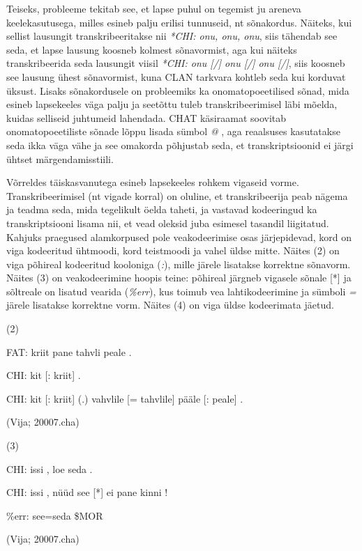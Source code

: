 \documentclass[12pt]{article}
\begin{document}
Teiseks, probleeme tekitab see, et lapse puhul on tegemist ju areneva keelekasutusega, milles esineb palju erilisi tunnuseid, nt sõnakordus. Näiteks, kui sellist lausungit transkribeeritakse nii \emph{*CHI: onu, onu, onu}, siis tähendab see seda, et lapse lausung koosneb kolmest sõnavormist, aga kui näiteks transkribeerida seda lausungit viisil \emph{*CHI: onu [/] onu [/] onu [/]}, siis koosneb see lausung ühest sõnavormist, kuna CLAN tarkvara kohtleb seda kui korduvat üksust. Lisaks sõnakordusele on probleemiks ka onomatopoeetilised sõnad, mida esineb lapsekeeles väga palju ja seetõttu tuleb transkribeerimisel läbi mõelda, kuidas selliseid juhtumeid lahendada. CHAT käsiraamat soovitab onomatopoeetiliste sõnade lõppu lisada sümbol \emph{@} \citep[72--73]{Argus2007}, aga reaalsuses kasutatakse seda ikka väga vähe ja see omakorda põhjustab seda, et transkriptsioonid ei järgi ühtset märgendamisstiili.

Võrreldes täiskasvanutega esineb lapsekeeles rohkem vigaseid vorme. Transkribeerimisel (nt vigade korral) on oluline, et transkribeerija peab nägema ja teadma seda, mida tegelikult öelda taheti, ja vastavad kodeeringud ka transkriptsiooni lisama nii, et vead oleksid juba esimesel tasandil liigitatud. \citep[74]{Argus2007} Kahjuks praegused alamkorpused pole veakodeerimise osas järjepidevad, kord on viga kodeeritud ühtmoodi, kord teistmoodi ja vahel üldse mitte. Näites (2) on viga põhireal kodeeritud kooloniga (\emph{:}), mille järele lisatakse korrektne sõnavorm. Näites (3) on veakodeerimine hoopis teine: põhireal järgneb vigasele sõnale [*] ja sõltreale on lisatud vearida (\emph{\%err}), kus  toimub vea lahtikodeerimine ja sümboli \emph{=} järele lisatakse korrektne vorm. Näites (4) on viga üldse kodeerimata jäetud.
\hfill

(2)
\begin{description}
    \item*FAT: kriit pane tahvli peale .
    \item*CHI: kit [: kriit] .
    \item*CHI: kit [: kriit] (.) vahvlile [= tahvlile] pääle [: peale] .
    \item(Vija; 20007.cha)
\end{description}
\hfill

(3)
\begin{description}
    \item*CHI: issi , loe seda .
    \item*CHI: issi , nüüd see [*] ei pane kinni !
    \item\%err: see=seda \$MOR
    \item(Vija; 20007.cha)
\end{description}
\hfill
\end{document}
